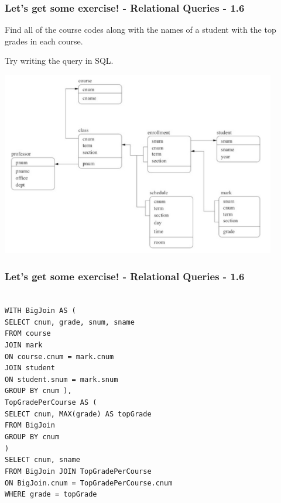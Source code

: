 \begin{frame}
\frametitle{Let's get some exercise! - Relational Queries - 1.6}

Find all of the course codes along with the names of a student with the top grades in each course.

Try writing the query in SQL.

\begin{center}
  \includegraphics[width=0.9\textwidth]{images/db-schema.png}
\end{center}

\end{frame}


\begin{frame}
\frametitle{Let's get some exercise! - Relational Queries - 1.6}


\texttt{ \\
  WITH BigJoin AS ( \\
    SELECT cnum, grade, snum, sname \\
    FROM course \\
    JOIN mark \\
    ON course.cnum = mark.cnum \\
    JOIN student \\
    ON student.snum = mark.snum \\
    GROUP BY cnum
  ), \\
  TopGradePerCourse AS ( \\
    SELECT cnum, MAX(grade) AS topGrade \\
    FROM BigJoin \\
    GROUP BY cnum \\
  ) \\
  SELECT cnum, sname \\
  FROM BigJoin
  JOIN TopGradePerCourse \\
  ON BigJoin.cnum = TopGradePerCourse.cnum \\
  WHERE grade = topGrade
}

\end{frame}


